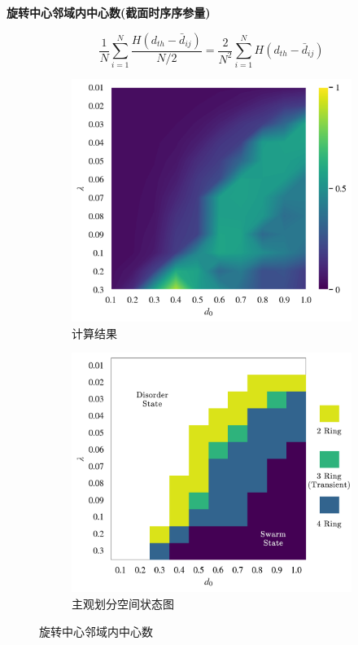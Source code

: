 \documentclass{article}
\begin{document}
\noindent\textbf{旋转中心邻域内中心数(截面时序序参量)}

$$
\frac{1}{N}\sum_{i=1}^N{\frac{H\left( d_{th}-\bar{d}_{ij} \right)}{N/2}}=\frac{2}{N^2}\sum_{i=1}^N{H\left( d_{th}-\bar{d}_{ij} \right)}
$$

\vspace{-0.5cm}
\begin{figure}[H]
	\centering
	\begin{subfigure}[b]{0.49\textwidth}
		\includegraphics[width=\textwidth]{./figs/nearbyNumsRing.png}
		\vspace{-1cm}
		\caption{计算结果}
		
	\end{subfigure}
	\begin{subfigure}[b]{0.49\textwidth}
		\includegraphics[width=\textwidth]{./figs/subjectiveOpRing.png}
		\vspace{-1cm}
		\caption{主观划分空间状态图}
	\end{subfigure}
	\vspace{-0.5cm}
	\caption{旋转中心邻域内中心数}
	\label{fig:fig234c.7.1}
\end{figure}
\end{document}
